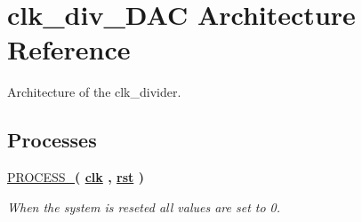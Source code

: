 \hypertarget{classclk__divide_1_1clk__div__DAC}{\section{clk\-\_\-div\-\_\-\-D\-A\-C Architecture Reference}
\label{classclk__divide_1_1clk__div__DAC}
}


Architecture of the clk\-\_\-divider.  


\subsection*{Processes}
 \begin{DoxyCompactItemize}
\item 
\hypertarget{classclk__divide_1_1clk__div__DAC_aae31a4dbedaf43cbd1619c642270813b}{\hyperlink{classclk__divide_1_1clk__div__DAC_aae31a4dbedaf43cbd1619c642270813b}{P\-R\-O\-C\-E\-S\-S\-\_}{\bfseries  ( {\bfseries {\bfseries \hyperlink{classclk__divide_a8120037e0ee47c35ba2d79242209c72e}{clk}} \textcolor{vhdlchar}{ }\textcolor{vhdlchar}{ }\textcolor{vhdlchar}{ }} , {\bfseries {\bfseries \hyperlink{classclk__divide_aa7b7040844189161771c36cf6bbf172c}{rst}} \textcolor{vhdlchar}{ }} )}}\label{classclk__divide_1_1clk__div__DAC_aae31a4dbedaf43cbd1619c642270813b}

\begin{DoxyCompactList}\small\item\em When the system is reseted all values are set to 0. \end{DoxyCompactList}\end{DoxyCompactItemize}
